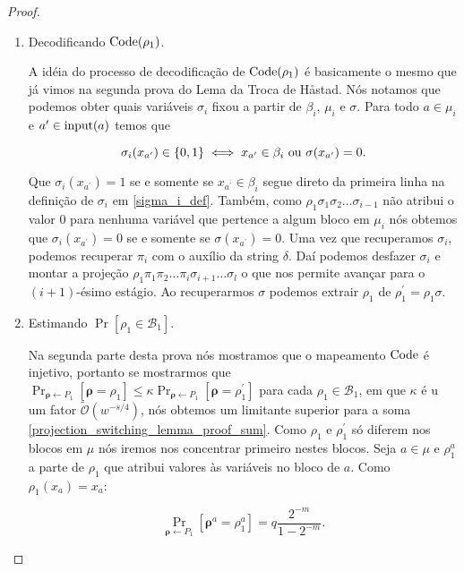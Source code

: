 \begin{proof}
\begin{enumerate}
	\item Decodificando $\text{Code}(\rho_{1})$.

	A idéia do processo de decodificação de $\text{Code}(\rho_{1})$ é basicamente o mesmo que já vimos na segunda prova do Lema da Troca de Håstad. Nós notamos que podemos obter quais variáveis $\sigma_{i}$ fixou a partir de $\beta_{i}$, $\mu_{i}$ e $\sigma$. Para todo $a \in \mu_{i}$ e $a^{\prime} \in \text{input}(a)$ temos que
	
	\begin{equation*}
		\sigma_{i}(x_{a^{\prime}}) \in \{0, 1\} \iff x_{a^{\prime}} \in \beta_{i} \text{ ou } \sigma(x_{a^{\prime}}) = 0.
	\end{equation*}

	Que $\sigma_{i}(x_{a^{\prime}}) = 1$ se e somente se $x_{a^{\prime}} \in \beta_{i}$ segue direto da primeira linha na definição de $\sigma_{i}$ em \ref{sigma_i_def}. Também, como $\rho_{1}\sigma_{1}\sigma_{2}\dots\sigma_{i - 1}$ não atribui o valor 0 para nenhuma variável que pertence a algum bloco em $\mu_{i}$ nós obtemos que $\sigma_{i}(x_{a^{\prime}}) = 0$ se e somente se $\sigma(x_{a^{\prime}}) = 0$. Uma vez que recuperamos $\sigma_{i}$, podemos recuperar $\pi_{i}$ com o auxílio da string $\delta$. Daí podemos desfazer $\sigma_{i}$ e montar a projeção $\rho_{1}\pi_{1}\pi_{2}\dots\pi_{i}\sigma_{i + 1}\dots\sigma_{l}$ o que nos permite avançar para o $(i + 1)$-ésimo estágio. Ao recuperarmos $\sigma$ podemos extrair $\rho_{1}$ de $\rho_{1}^{\prime} = \rho_{1}\sigma$.
	
	\item Estimando $\Pr[\rho_{1} \in \mathcal{B}_{1}]$.
	
	Na segunda parte desta prova nós mostramos que o mapeamento $\text{Code}$ é injetivo, portanto se mostrarmos que $\Pr_{\boldsymbol{\rho} \leftarrow P_{1}}[\boldsymbol{\rho} = \rho_{1}] \leq \kappa\Pr_{\boldsymbol{\rho} \leftarrow P_{1}}[\boldsymbol{\rho} = \rho_{1}^{\prime}]$ para cada $\rho_{1} \in \mathcal{B}_{1}$, em que $\kappa$ é u um fator $\widetilde{\mathcal{O}}(w^{-s/4})$, nós obtemos um limitante superior para a soma \ref{projection_switching_lemma_proof_sum}. Como $\rho_{1}$ e $\rho_{1}^{\prime}$ só diferem nos blocos em $\mu$ nós iremos nos concentrar primeiro nestes blocos. Seja $a \in \mu$ e $\rho_{1}^{a}$ a parte de $\rho_{1}$ que atribui valores às variáveis no bloco de $a$. Como $\rho_{1}(x_{a}) = x_{a}$:
	
	\begin{equation*}
		\Pr_{\boldsymbol{\rho} \leftarrow P_{1}}[\boldsymbol{\rho}^{a} = \rho_{1}^{a}] = q\frac{2^{-m}}{1 - 2^{-m}}.
	\end{equation*}


\end{enumerate}
\end{proof}
